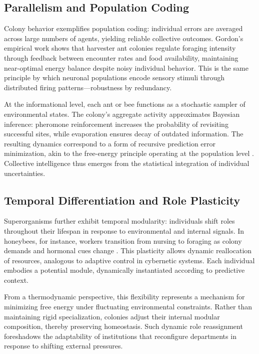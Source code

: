 \documentclass[11pt,a4paper]{article}
\begin{document}
\subsection{Parallelism and Population Coding}

Colony behavior exemplifies population coding: individual errors are averaged across large numbers of agents, yielding reliable collective outcomes.  Gordon’s empirical work shows that harvester ant colonies regulate foraging intensity through feedback between encounter rates and food availability, maintaining near-optimal energy balance despite noisy individual behavior.  This is the same principle by which neuronal populations encode sensory stimuli through distributed firing patterns—robustness by redundancy.

At the informational level, each ant or bee functions as a stochastic sampler of environmental states.  The colony’s aggregate activity approximates Bayesian inference: pheromone reinforcement increases the probability of revisiting successful sites, while evaporation ensures decay of outdated information.  The resulting dynamics correspond to a form of recursive prediction error minimization, akin to the free-energy principle operating at the population level \citep{Friston2010FreeEnergyPrinciple}.  Collective intelligence thus emerges from the statistical integration of individual uncertainties.

\subsection{Temporal Differentiation and Role Plasticity}

Superorganisms further exhibit temporal modularity: individuals shift roles throughout their lifespan in response to environmental and internal signals.  In honeybees, for instance, workers transition from nursing to foraging as colony demands and hormonal cues change \citep{Seeley2010HoneybeeDemocracy}.  This plasticity allows dynamic reallocation of resources, analogous to adaptive control in cybernetic systems.  Each individual embodies a potential module, dynamically instantiated according to predictive context.

From a thermodynamic perspective, this flexibility represents a mechanism for minimizing free energy under fluctuating environmental constraints.  Rather than maintaining rigid specialization, colonies adjust their internal modular composition, thereby preserving homeostasis.  Such dynamic role reassignment foreshadows the adaptability of institutions that reconfigure departments in response to shifting external pressures.
\end{document}
